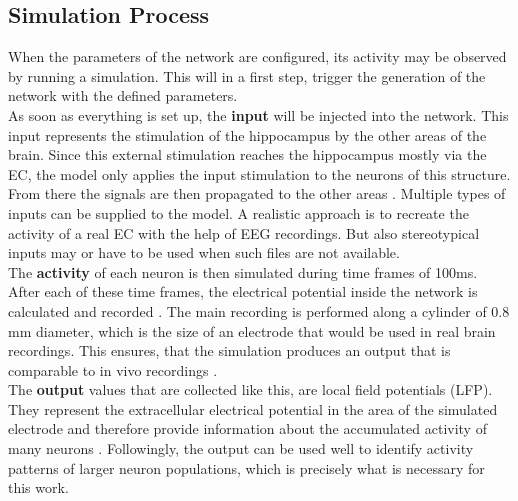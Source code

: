     \subsection{Simulation Process}
    When the parameters of the network are configured, its activity may be observed by running a simulation. This will in a first step, trigger the generation of the network with the defined parameters.\\
    As soon as everything is set up, the \textbf{input} will be injected into the network. This input represents the stimulation of the hippocampus by the other areas of the brain. Since this external stimulation reaches the hippocampus mostly via the EC, the model only applies the input stimulation to the neurons of this structure. From there the signals are then propagated to the other areas \cite{Aussel.2018}. Multiple types of inputs can be supplied to the model. A realistic approach is to recreate the activity of a real EC with the help of EEG recordings. But also stereotypical inputs may or have to be used when such files are not available.\\
    The \textbf{activity} of each neuron is then simulated during time frames of 100ms. After each of these time frames, the electrical potential inside the network is calculated and recorded \cite{HippSimModel.1}. The main recording is performed along a cylinder of 0.8 mm diameter, which is the size of an electrode that would be used in real brain recordings. This ensures, that the simulation produces an output that is comparable to in vivo recordings \cite{Aussel.2018}.\\
    The \textbf{output} values that are collected like this, are local field potentials (LFP). They represent the extracellular electrical potential in the area of the simulated electrode and therefore provide information about the accumulated activity of many neurons \cite{Aussel.2018}. Followingly, the output can be used well to identify activity patterns of larger neuron populations, which is precisely what is necessary for this work. 
    
    
